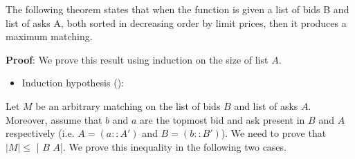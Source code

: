 \documentclass[a4paper,UKenglish,cleveref, autoref]{lipics-v2019}
\begin{document}
The following theorem states that when the function  is given a list of bids B and list of asks A, both sorted in decreasing order by limit prices, then it produces a maximum matching.
\begin{theorem}
\end{theorem}
\textbf{Proof}: We prove this result using induction on the size of list $A$. 
\begin{itemize}
\item Induction hypothesis (): \emph{  }
\end{itemize}
Let $M$ be an arbitrary matching on the list of bids $B$ and list of asks $A$. Moreover, assume that $b$ and $a$ are the topmost bid and ask present in $B$ and $A$ respectively (i.e. $A = (a::A')$ and $B = (b::B')$). We need to prove that $|M| \leq$ | $B$ $A$|.  We prove this inequality in  the following two cases.
\end{document}
